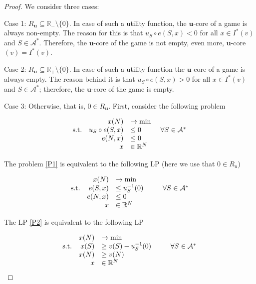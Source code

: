 \documentclass[a4paper,12pt]{article}
\theoremstyle{definition}
\theoremstyle{remark}
\begin{document}
\begin{proof}
We consider three cases:

Case 1: $R_{\mathbf{u}} \subseteq \mathbb{R}_{-}\setminus \{ 0\} $. In case of such a utility function, the $\mathbf{u}$-core of a game is always non-empty. The reason for this is that $u_S\circ e(S, x) < 0$ for all $x\in I^*(v)$ and $S\in \mathcal{A}^*$. Therefore, the $\mathbf{u}$-core of the game is not empty, even more, $\mathbf{u}$-core$(v) = I^\ast (v)$.

\bigskip

Case 2: $R_{\mathbf{u}} \subseteq \mathbb{R}_{+}\setminus \{ 0\} $. In case of such a utility function the $\mathbf{u}$-core of a game is always empty. The reason behind it is that $u_S\circ e(S, x) > 0$ for all $x\in I^*(v)$ and $S\in \mathcal{A}^*$; therefore, the $\mathbf{u}$-core of the game is empty.

\bigskip

Case 3: Otherwise, that is, $0\in R_{\mathbf{u}}$. First, consider the following problem

\begin{equation}\label{P1}
\begin{array}{lrl}
& x (N) & \to \min \\
\textup{s.t.} & u_S \circ e (S,x) & \leq 0 \mspace{50mu} \forall S \in \mathcal{A}^* \\
& e(N, x) & \leq 0 \\
& x & \in \mathbb{R}^N \\   
\end{array}
\end{equation}

The problem \eqref{P1} is equivalent to the following LP (here we use that $0\in R_u$)

\begin{equation}\label{P2}
\begin{array}{lrl}
& x (N) & \to \min \\
\textup{s.t.} &  e (S,x) & \leq u_S^{-1}(0) \mspace{50mu} \forall S \in \mathcal{A}^* \\
& e(N, x) & \leq 0 \\
& x & \in \mathbb{R}^N \\   
\end{array}
\end{equation}

The LP \eqref{P2} is equivalent to the following LP

\begin{equation}\label{P3}
\begin{array}{lrl}
& x (N) & \to \min \\
\textup{s.t.} &  x(S) & \geq v(S) - u_S^{-1}(0) \mspace{50mu} \forall S \in \mathcal{A}^*  \\
& x(N) & \geq v(N) \\
& x & \in \mathbb{R}^N \\   
\end{array}
\end{equation}


\end{proof}
\end{document}
